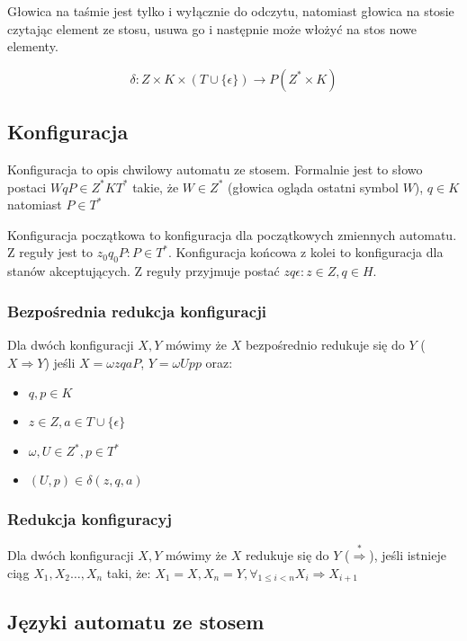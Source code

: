 \documentclass{../notatki}
\begin{document}
Głowica na taśmie jest tylko i wyłącznie do odczytu, natomiast głowica na stosie
czytając element ze stosu, usuwa go i następnie może włożyć na stos nowe
elementy.

$$
\delta: Z \times K \times (T \cup \{\epsilon\}) \rightarrow P(Z^* \times K)
$$

\subsection{Konfiguracja}

Konfiguracja to opis chwilowy automatu ze stosem. Formalnie jest to słowo
postaci $WqP \in Z^*KT^*$ takie, że $W \in Z^*$ (głowica ogląda ostatni symbol
$W$), $q \in K$ natomiast $P \in T^*$

Konfiguracja początkowa to konfiguracja dla początkowych zmiennych automatu.
Z reguły jest to $z_0q_0P : P \in T^*$. Konfiguracja końcowa z kolei to
konfiguracja dla stanów akceptujących. Z reguły przyjmuje postać $z
q\epsilon : z \in Z, q \in H$.

\subsubsection{Bezpośrednia redukcja konfiguracji}

Dla dwóch konfiguracji $X, Y$ mówimy że $X$ bezpośrednio redukuje się do $Y$
($X \Rightarrow Y$) jeśli $X=\omega zqaP$, $Y=\omega Upp$ oraz:

\begin{itemize}
  \item $q,p \in K$
  \item $z \in Z, a \in T \cup \{\epsilon\}$
  \item $\omega, U \in Z^*, p \in T^*$
  \item $(U, p) \in \delta(z, q, a)$
\end{itemize}

\subsubsection{Redukcja konfiguracyj}

Dla dwóch konfiguracji $X, Y$ mówimy że $X$ redukuje się do $Y$
($\stackrel{*}{\Rightarrow}$), jeśli istnieje ciąg $X_1,X_2\dots, X_n$ taki, że:
$X_1 = X, X_n = Y, \forall_{1 \le i < n}X_i \Rightarrow X_{i + 1}$

\subsection{Języki automatu ze stosem}
\end{document}
